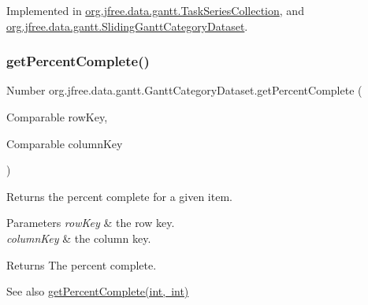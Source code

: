 Implemented in \mbox{\hyperlink{classorg_1_1jfree_1_1data_1_1gantt_1_1_task_series_collection_aca8d6ce318feece476883aa73a5cd32e}{org.\+jfree.\+data.\+gantt.\+Task\+Series\+Collection}}, and \mbox{\hyperlink{classorg_1_1jfree_1_1data_1_1gantt_1_1_sliding_gantt_category_dataset_abcf830d408f2f594737b6c5facbc620c}{org.\+jfree.\+data.\+gantt.\+Sliding\+Gantt\+Category\+Dataset}}.

\mbox{\label{interfaceorg_1_1jfree_1_1data_1_1gantt_1_1_gantt_category_dataset_aa5ddb721d32f80a587877db94589b9fd}} 
\subsubsection{\texorpdfstring{get\+Percent\+Complete()}{getPercentComplete()}\hspace{0.1cm}{\footnotesize\ttfamily [2/4]}}
{\footnotesize\ttfamily Number org.\+jfree.\+data.\+gantt.\+Gantt\+Category\+Dataset.\+get\+Percent\+Complete (\begin{DoxyParamCaption}\item[{Comparable}]{row\+Key,  }\item[{Comparable}]{column\+Key }\end{DoxyParamCaption})}

Returns the percent complete for a given item.


\begin{DoxyParams}{Parameters}
{\em row\+Key} & the row key. \\
\hline
{\em column\+Key} & the column key.\\
\hline
\end{DoxyParams}
\begin{DoxyReturn}{Returns}
The percent complete.
\end{DoxyReturn}
\begin{DoxySeeAlso}{See also}
\mbox{\hyperlink{interfaceorg_1_1jfree_1_1data_1_1gantt_1_1_gantt_category_dataset_a92688e6bd8e5eb38b2c78888c21c8a2f}{get\+Percent\+Complete(int, int)}} 
\end{DoxySeeAlso}


